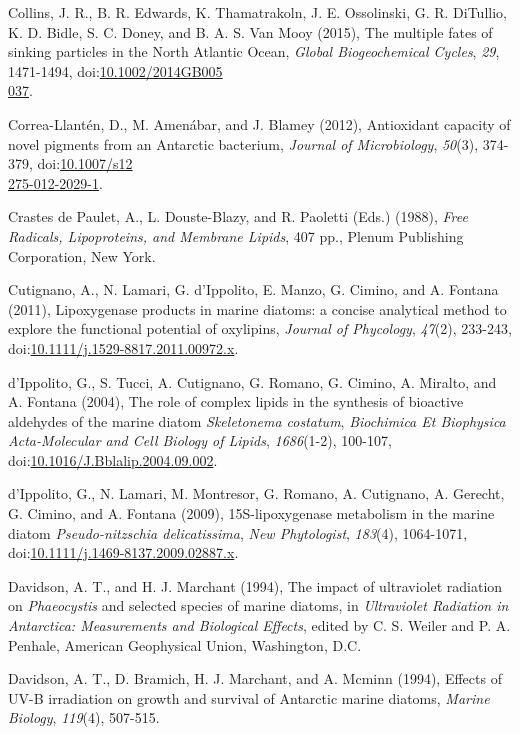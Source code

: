 \begin{singlespace}
{{Collins, J. R., B. R. Edwards, K. Thamatrakoln, J. E. Ossolinski, G. R. DiTullio, K. D. Bidle, S. C. Doney, and B. A. S. Van Mooy (2015), The multiple fates of sinking particles in the North Atlantic Ocean, \emph{Global Biogeochemical Cycles}, \emph{29}, 1471-1494, doi:\href{http://dx.doi.org/10.1002/2014GB005037}{10.1002/2014GB005\\037}.

Correa-Llant\'{e}n, D., M. Amen\'{a}bar, and J. Blamey (2012), Antioxidant capacity of novel pigments from an Antarctic bacterium, \emph{Journal of Microbiology}, \emph{50}(3), 374-379, doi:\href{http://dx.doi.org/10.1007/s12275-012-2029-1}{10.1007/s12\\275-012-2029-1}.

Crastes de Paulet, A., L. Douste-Blazy, and R. Paoletti (Eds.) (1988), \emph{Free Radicals, Lipoproteins, and Membrane Lipids}, 407 pp., Plenum Publishing Corporation, New York.

Cutignano, A., N. Lamari, G. d'Ippolito, E. Manzo, G. Cimino, and A. Fontana (2011), Lipoxygenase products in marine diatoms: a concise analytical method to explore the functional potential of oxylipins, \emph{Journal of Phycology}, \emph{47}(2), 233-243, doi:\href{http://dx.doi.org/10.1111/j.1529-8817.2011.00972.x}{10.1111/j.1529-8817.2011.00972.x}.

d'Ippolito, G., S. Tucci, A. Cutignano, G. Romano, G. Cimino, A. Miralto, and A. Fontana (2004), The role of complex lipids in the synthesis of bioactive aldehydes of the marine diatom \emph{Skeletonema costatum}, \emph{Biochimica Et Biophysica Acta-Molecular and Cell Biology of Lipids}, \emph{1686}(1-2), 100-107, doi:\href{http://dx.doi.org/10.1016/J.Bblalip.2004.09.002}{10.1016/J.Bblalip.2004.09.002}.

d'Ippolito, G., N. Lamari, M. Montresor, G. Romano, A. Cutignano, A. Gerecht, G. Cimino, and A. Fontana (2009), 15S-lipoxygenase metabolism in the marine diatom \emph{Pseudo-nitzschia delicatissima}, \emph{New Phytologist}, \emph{183}(4), 1064-1071, doi:\href{http://dx.doi.org/10.1111/j.1469-8137.2009.02887.x}{10.1111/j.1469-8137.2009.02887.x}.

Davidson, A. T., and H. J. Marchant (1994), The impact of ultraviolet radiation on \emph{Phaeocystis} and selected species of marine diatoms, in \emph{Ultraviolet Radiation in Antarctica: Measurements and Biological Effects}, edited by C. S. Weiler and P. A. Penhale, American Geophysical Union, Washington, D.C.

Davidson, A. T., D. Bramich, H. J. Marchant, and A. Mcminn (1994), Effects of UV-B irradiation on growth and survival of Antarctic marine diatoms, \emph{Marine Biology}, \emph{119}(4), 507-515.

}}
\end{singlespace}
